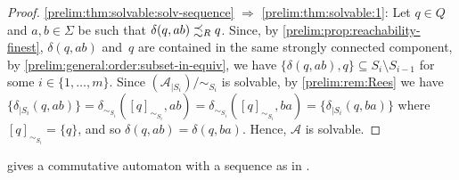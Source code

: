 \begin{proof}
\ref{prelim:thm:solvable:solv-sequence} $\Rightarrow$ \ref{prelim:thm:solvable:1}: Let $q \in Q$
and $a,b \in \Sigma$ be such that $\delta(q, ab) \precsim_R q$.
Since, by \cref{prelim:prop:reachability-finest}, $\delta(q,ab)$ and~$q$
are contained in the same strongly connected component, by \cref{prelim:general:order:subset-in-equiv},
we have $\{ \delta(q, ab), q \} \subseteq S_i \setminus S_{i-1}$ for some $i \in \{1,\ldots,m\}$.
Since $(\mathcal A_{|S_i} ) / {\sim_{S_i}}$ is solvable,
by \cref{prelim:rem:Rees} we have 
$\{ \delta_{|S_i}(q, ab) \} = \delta_{\sim_{S_i}}([q]_{\sim_{S_i}}, ab) = 
\delta_{\sim_{S_i}}([q]_{\sim_{S_i}}, ba) = \{ \delta_{|S_i}(q, ba) \}$
where $[q]_{\sim_{S_i}} = \{q\}$,
and so $\delta(q, ab) = \delta(q, ba)$.
Hence, $\mathcal A$ is solvable.
%
\end{proof}

 gives a commutative automaton
with a sequence as in .

